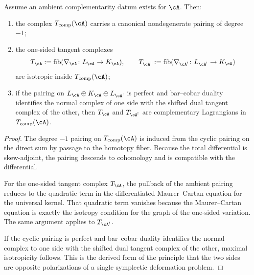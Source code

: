 \begin{theorem}
\label{thm:ambient-complementarity-tangent}
\ClaimStatusProvedHere
Assume an ambient complementarity datum exists for $\cA$. Then:
\begin{enumerate}[label=\textup{(\roman*)}]
\item the complex $T_{\mathrm{comp}}(\cA)$ carries a canonical
nondegenerate pairing of degree $-1$;
\item the one-sided tangent complexes
\[
T_{\cA} := \operatorname{fib}(\nabla_{\cA} \colon L_{\cA} \to K_{\cA}),
\qquad
T_{\cA^!} := \operatorname{fib}(\nabla_{\cA^!} \colon L_{\cA^!} \to K_{\cA})
\]
are isotropic inside $T_{\mathrm{comp}}(\cA)$;
\item if the pairing on $L_{\cA} \oplus K_{\cA} \oplus L_{\cA^!}$
is perfect and bar--cobar duality identifies the normal complex of
one side with the shifted dual tangent complex of the other, then
$T_{\cA}$ and $T_{\cA^!}$ are complementary Lagrangians in
$T_{\mathrm{comp}}(\cA)$.
\end{enumerate}
\end{theorem}

\begin{proof}
The degree $-1$ pairing on $T_{\mathrm{comp}}(\cA)$ is induced from the
cyclic pairing on the direct sum by passage to the homotopy fiber.
Because the total differential is skew-adjoint, the pairing descends to
cohomology and is compatible with the differential.

For the one-sided tangent complex $T_{\cA}$, the pullback of the ambient
pairing reduces to the quadratic term in the differentiated
Maurer--Cartan equation for the universal kernel. That quadratic term
vanishes because the Maurer--Cartan equation is exactly the isotropy
condition for the graph of the one-sided variation. The same argument
applies to $T_{\cA^!}$.

If the cyclic pairing is perfect and bar--cobar duality identifies the
normal complex to one side with the shifted dual tangent complex of the
other, maximal isotropicity follows. This is the derived form of the
principle that the two sides are opposite polarizations of a single
symplectic deformation problem.
\end{proof}

